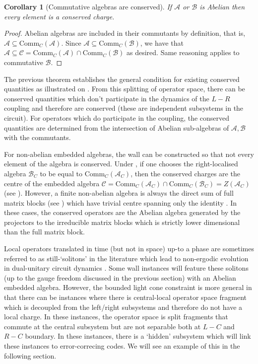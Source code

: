 \documentclass[11pt, twocolumn, floatfix, superscriptaddress, aps, prb, raggedbottom]{revtex4-2}
\newtheorem{corollary}[theorem]{Corollary}
\newcommand{\comm}{\mathrm{Comm}}
\begin{document}
\begin{corollary}[Commutative algebras are conserved]
    If $\mathcal{A}$ or $\mathcal{B}$ is Abelian then every element is a conserved charge.
\end{corollary}
\begin{proof}
    Abelian algebras are included in their commutants by definition, that is,  $\mathcal{A} \subseteq\comm_C(\mathcal{A})$. Since $\mathcal{A} \subseteq \comm_C(\mathcal{B})$, we have that $\mathcal{A} \subseteq \mathcal{C}= \comm_C(\mathcal{A}) \cap \comm_C(\mathcal{B})$ as desired. Same reasoning applies to commutative $\mathcal{B}$.
\end{proof}

\noindent The previous theorem establishes the general condition for existing conserved quantities as illustrated on . From this splitting of operator space, there can be conserved quantities which don't participate in the dynamics of the $L-R$ coupling and therefore are conserved (these are independent subsystems in the circuit). For operators which do participate in the coupling, the conserved quantities are determined from the intersection of Abelian sub-algebras of $\mathcal{A}, \mathcal{B}$ with the commutants.

 For non-abelian embedded algebras, the wall can be constructed so that not every element of the algebra is conserved. Under , if one chooses the right-localised algebra $\mathcal{B}_C$ to be equal to $\comm_C(\mathcal{A}_C)$, then the conserved charges are the centre of the embedded algebra $\mathcal{C} = \comm_C(\mathcal{A}_C)\cap \comm_C(\mathcal{B}_C) =  Z(\mathcal{A}_C)$ (see ). However, a finite non-abelian algebra is always the direct sum of full matrix blocks (see ) which have trivial centre spanning only the identity \cite{Bény2020}. In these cases, the conserved operators are the Abelian algebra generated by the projectors to the irreducible matrix blocks which is strictly lower dimensional than the full matrix block. 

Local operators translated in time (but not in space) up-to a phase are sometimes referred to as still-\enquote*{solitons} in the literature which lead to non-ergodic evolution in dual-unitary circuit dynamics \cite{Bertini2020_op_ent1, Bertini2020_op_ent2, HoldenDye2025fundamentalcharges}. Some wall instances will feature these solitons (up to the gauge freedom discussed in the previous section) with an Abelian embedded algebra. However, the bounded light cone constraint is more general in that there can be instances where there is central-local operator space fragment which is decoupled from the left/right subsystems and therefore do not have a local charge. In these instances, the operator space is split fragments that commute at the central subsystem but are not separable both at $L-C$ and $R-C$ boundary. In these instances, there is a \enquote*{hidden} subsystem which will link these instances to error-correcing codes. We will see an example of this in the following section. 
\end{document}
